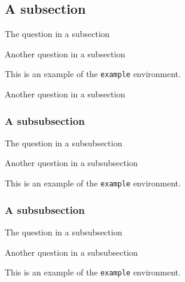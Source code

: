 \documentclass{scrartcl}
\begin{document}
\subsection{A subsection}

\begin{question}
The question in a subsection
\end{question}

\begin{question}
Another question in a subsection
\end{question}

\begin{example}
    This is an example of the \texttt{example} environment.
\end{example}

\begin{question}
Another question in a subsection
\end{question}

\subsubsection{A subsubsection}

\begin{question}
The question in a subsubsection
\end{question}

\begin{question}
Another question in a subsubsection
\end{question}

\begin{example}
    This is an example of the \texttt{example} environment.
\end{example}

\subsubsection{A subsubsection}

\begin{question}
The question in a subsubsection
\end{question}

\begin{question}
Another question in a subsubsection
\end{question}

\begin{example}
    This is an example of the \texttt{example} environment.
\end{example}
\end{document}
